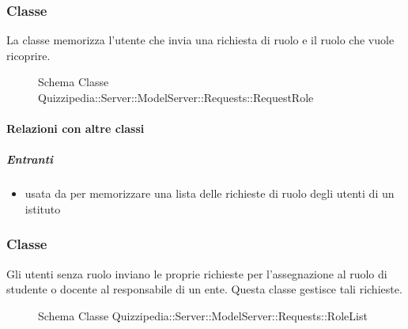 \subsubsection{Classe }
La classe memorizza l'utente che invia una richiesta di ruolo e il ruolo che vuole ricoprire.
\begin{figure}[H]
\centering
\noindent{}
\caption[Schema Classe RequestRole]{Schema Classe Quizzipedia::Server::ModelServer::Requests::RequestRole}
\end{figure}
\paragraph{Relazioni con altre classi}
\subparagraph{Entranti}
\begin{itemize}
\item usata da  per memorizzare una lista delle richieste di ruolo degli utenti di un istituto
\end{itemize}
\subsubsection{Classe }
Gli utenti senza ruolo inviano le proprie richieste per l'assegnazione al ruolo di studente o docente al responsabile di un ente. Questa classe gestisce tali richieste.
\begin{figure}[H]
\centering
\noindent{}
\caption[Schema Classe RoleList]{Schema Classe Quizzipedia::Server::ModelServer::Requests::RoleList}
\end{figure}
